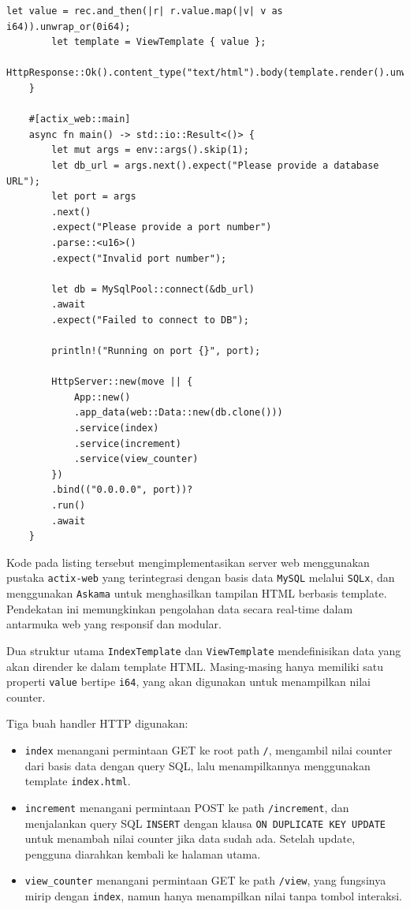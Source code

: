 \begin{lstlisting}[style=RustStyle, caption={Implementasi server Actix Web dengan SQLx dan Askama}]
		let value = rec.and_then(|r| r.value.map(|v| v as i64)).unwrap_or(0i64);
		let template = ViewTemplate { value };
		HttpResponse::Ok().content_type("text/html").body(template.render().unwrap())
	}
	
	#[actix_web::main]
	async fn main() -> std::io::Result<()> {
		let mut args = env::args().skip(1);
		let db_url = args.next().expect("Please provide a database URL");
		let port = args
		.next()
		.expect("Please provide a port number")
		.parse::<u16>()
		.expect("Invalid port number");
		
		let db = MySqlPool::connect(&db_url)
		.await
		.expect("Failed to connect to DB");
		
		println!("Running on port {}", port);
		
		HttpServer::new(move || {
			App::new()
			.app_data(web::Data::new(db.clone()))
			.service(index)
			.service(increment)
			.service(view_counter)
		})
		.bind(("0.0.0.0", port))?
		.run()
		.await
	}
\end{lstlisting}

Kode pada listing tersebut mengimplementasikan server web menggunakan pustaka \texttt{actix-web} yang terintegrasi dengan basis data \texttt{MySQL} melalui \texttt{SQLx}, dan menggunakan \texttt{Askama} untuk menghasilkan tampilan HTML berbasis template. Pendekatan ini memungkinkan pengolahan data secara real-time dalam antarmuka web yang responsif dan modular.

Dua struktur utama \texttt{IndexTemplate} dan \texttt{ViewTemplate} mendefinisikan data yang akan dirender ke dalam template HTML. Masing-masing hanya memiliki satu properti \texttt{value} bertipe \texttt{i64}, yang akan digunakan untuk menampilkan nilai counter.

Tiga buah handler HTTP digunakan:
\begin{itemize}
	\item \texttt{index} menangani permintaan GET ke root path \texttt{/}, mengambil nilai counter dari basis data dengan query SQL, lalu menampilkannya menggunakan template \texttt{index.html}.
	\item \texttt{increment} menangani permintaan POST ke path \texttt{/increment}, dan menjalankan query SQL \texttt{INSERT} dengan klausa \texttt{ON DUPLICATE KEY UPDATE} untuk menambah nilai counter jika data sudah ada. Setelah update, pengguna diarahkan kembali ke halaman utama.
	\item \texttt{view\_counter} menangani permintaan GET ke path \texttt{/view}, yang fungsinya mirip dengan \texttt{index}, namun hanya menampilkan nilai tanpa tombol interaksi.
\end{itemize}

